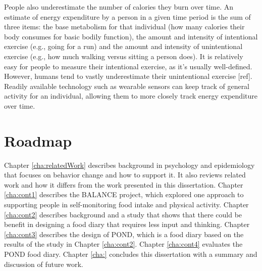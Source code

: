People also underestimate the number of calories they burn over time. An estimate of energy expenditure by a person in a given time period is the sum of three items: the base metabolism for that individual (how many calories their body consumes for basic bodily function), the amount and intensity of intentional exercise (e.g., going for a run) and the amount and intensity of unintentional exercise (e.g., how much walking versus sitting a person does). It is relatively easy for people to measure their intentional exercise, as it's usually well-defined. However, humans tend to vastly underestimate their unintentional exercise [ref]. Readily available technology such as wearable sensors can keep track of general activity for an individual, allowing them to more closely track energy expenditure over time. 

\section{Roadmap}
Chapter \ref{cha:relatedWork} describes background in psychology and epidemiology that focuses on behavior change and how to support it. It also reviews related work and how it differs from the work presented in this dissertation.  Chapter \ref{cha:cont1} describes the BALANCE project, which explored one approach to supporting people in self-monitoring food intake and physical activity. Chapter \ref{cha:cont2} describes background and a study that shows that there could be benefit in designing a food diary that requires less input and thinking. Chapter \ref{cha:cont3} describes the design of POND, which is a food diary based on the results of the study in Chapter \ref{cha:cont2}. Chapter \ref{cha:cont4} evaluates the POND food diary. Chapter \ref{cha:} concludes this dissertation with a summary and discussion of future work. 
